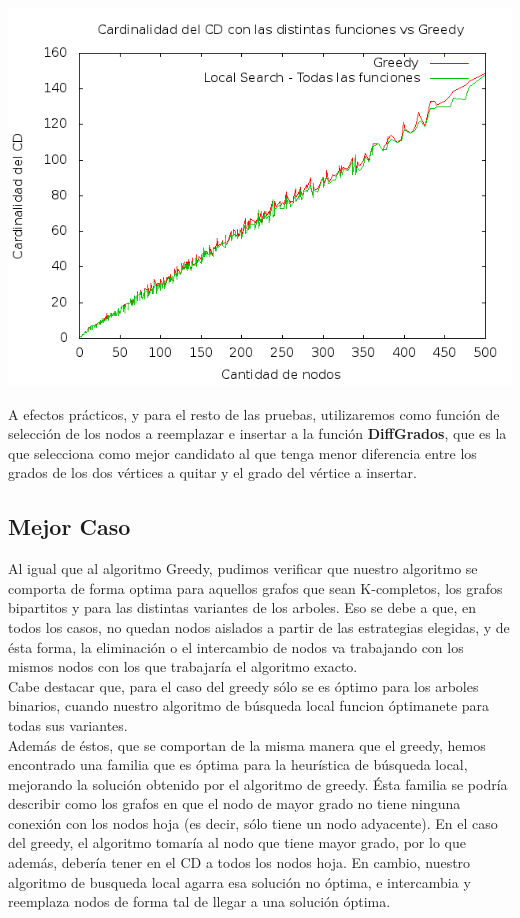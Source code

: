 \begin{center}
\includegraphics[width=17cm]{./graficos/comparacionSoluciones.png}
\end{center}

A efectos prácticos, y para el resto de las pruebas, utilizaremos como función de selección de los nodos a reemplazar e insertar a la función \textbf{DiffGrados}, que es la que selecciona como mejor candidato al que tenga menor diferencia entre los grados de los dos vértices a quitar y el grado del vértice a insertar.

\subsection{Mejor Caso}
Al igual que al algoritmo Greedy, pudimos verificar que nuestro algoritmo se comporta de forma optima para aquellos grafos que sean K-completos, los grafos bipartitos y para las distintas variantes de los arboles. Eso se debe a que, en todos los casos, no quedan nodos aislados a partir de las estrategias elegidas, y de ésta forma, la eliminación o el intercambio de nodos va trabajando con los mismos nodos con los que trabajaría el algoritmo exacto. \\
Cabe destacar que, para el caso del greedy sólo se es óptimo para los arboles binarios, cuando nuestro algoritmo de búsqueda local funcion óptimanete para todas sus variantes.\\
Además de éstos, que se comportan de la misma manera que el greedy, hemos encontrado una familia que es óptima para la heurística de búsqueda local, mejorando la solución obtenido por el algoritmo de greedy. Ésta familia se podría describir como los grafos en que el nodo de mayor grado no tiene ninguna conexión con los nodos hoja (es decir, sólo tiene un nodo adyacente). En el caso del greedy, el algoritmo tomaría al nodo que tiene mayor grado, por lo que además, debería tener en el CD a todos los nodos hoja. En cambio, nuestro algoritmo de busqueda local agarra esa solución no óptima, e intercambia y reemplaza nodos de forma tal de llegar a una solución óptima. \\

